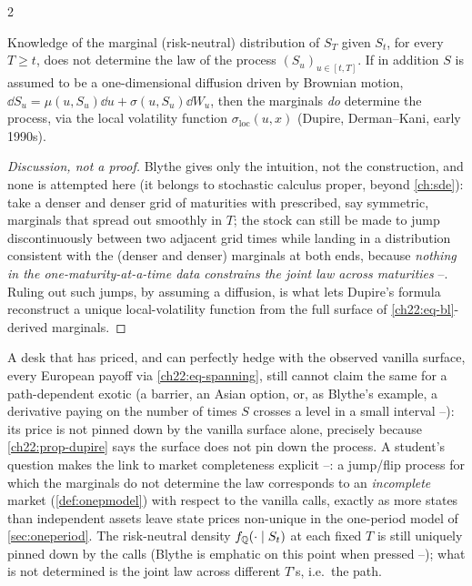 \begin{paracol}{2}
\begin{proposition}\label{ch22:prop-dupire}
Knowledge of the marginal (risk-neutral) distribution of $S_T$ given $S_t$, for every $T\ge t$, does
not determine the law of the process $(S_u)_{u\in[t,T]}$. If in addition $S$ is assumed to be a
one-dimensional diffusion driven by Brownian motion, $\dd S_u=\mu(u,S_u)\dd u+\sigma(u,S_u)\dd W_u$,
then the marginals \emph{do} determine the process, via the local volatility function
$\sigma_{\mathrm{loc}}(u,x)$ (Dupire, Derman--Kani, early 1990s).
\end{proposition}
\begin{proof}[Discussion, not a proof]
Blythe gives only the intuition, not the construction, and none is attempted here (it belongs to
stochastic calculus proper, beyond \cref{ch:sde}): take a denser and denser grid of maturities with
prescribed, say symmetric, marginals that spread out smoothly in $T$; the stock can still be made to
jump discontinuously between two adjacent grid times while landing in a distribution consistent with
the (denser and denser) marginals at both ends, because \emph{nothing in the one-maturity-at-a-time
data constrains the joint law across maturities} --. Ruling
out such jumps, by assuming a diffusion, is what lets Dupire's formula reconstruct a unique
local-volatility function from the full surface of \eqref{ch22:eq-bl}-derived marginals.
\end{proof}

\begin{finance}
A desk that has priced, and can perfectly hedge with the observed vanilla surface, every European
payoff via \eqref{ch22:eq-spanning}, still cannot claim the same for a path-dependent exotic (a
barrier, an Asian option, or, as Blythe's example, a derivative paying on the number of times $S$
crosses a level in a small interval --): its price is not
pinned down by the vanilla surface alone, precisely because \cref{ch22:prop-dupire} says the surface
does not pin down the process. A student's question makes the link to market completeness explicit
--: a jump/flip process for which the marginals do not
determine the law corresponds to an \emph{incomplete} market (\cref{def:onepmodel}) with respect to
the vanilla calls, exactly as more states than independent assets leave state prices non-unique in the
one-period model of \cref{sec:oneperiod}. The risk-neutral density $f_{\mathbb{Q}}(\cdot\mid S_t)$ at each
fixed $T$ is still uniquely pinned down by the calls (Blythe is emphatic on this point when pressed
--); what is not determined is the joint law across different
$T$'s, i.e.\ the path.
\end{finance}


\end{paracol}
